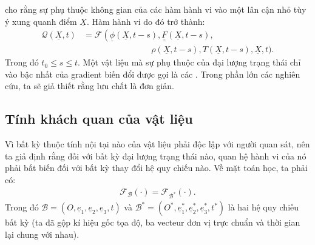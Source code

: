 \documentclass[../../../main.tex]{subfiles}
\begin{document}
     cho rằng sự phụ thuộc không gian của các hàm hành vi vào một lân cận nhỏ tùy ý xung quanh điểm $\underline{X}$. Hàm hành vi do đó trở thành:
		\begin{equation}
    		\begin{aligned}
    			\mathcal{Q}\left(\underline{X},t\right)&=\mathcal{F}\left(\underline{\phi}\left(\underline{X},t-s\right),\underline{\underline{F}}\left(\underline{X},t-s\right),\right.\\
				&\qquad\qquad\qquad\qquad\rho\left(\underline{X},t-s\right),T\left(\underline{X},t-s\right),\underline{X},t\bigr).
			\end{aligned}
    	\end{equation}
    Trong đó $t_0\leq s\leq t$. Một vật liệu mà sự phụ thuộc của đại lượng trạng thái chỉ vào bậc nhất của gradient biến đổi được gọi là các . Trong phần lớn các nghiên cứu, ta sẽ giả thiết rằng lưu chất là đơn giản.
\subsection{Tính khách quan của vật liệu}
	Vì bất kỳ thuộc tính nội tại nào của vật liệu phải độc lập với người quan sát, nên ta giả định rằng đối với bất kỳ đại lượng trạng thái nào, quan hệ hành vi của nó phải bất biến đối với bất kỳ thay đổi hệ quy chiếu nào. Về mặt toán học, ta phải có:
		\begin{align}
			\mathcal{F}_{\mathcal{B}}\left(\cdot\right)=\mathcal{F}_{\mathcal{B}^*}\left(\cdot\right).
		\end{align}
	Trong đó $\mathcal{B}=\left(O,\underline{e}_1,\underline{e}_2,\underline{e}_3,t\right)$ và $\mathcal{B}^*=\left(O^*,\underline{e}_1^*,\underline{e}_2^*,\underline{e}_3^*,t^*\right)$ là hai hệ quy chiếu bất kỳ (ta đã gộp kí hiệu gốc tọa độ, ba vecteur đơn vị trực chuẩn và thời gian lại chung với nhau).
	
\end{document}
